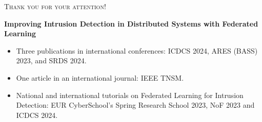 



\begin{frame}
  \centering
  \scshape\Large Thank you for your attention!

  \vfill
  
  \normalshape\normalsize

  \textbf{Improving Intrusion Detection in Distributed Systems with Federated Learning}
  
  \bigskip
  \raggedright
  \begin{itemize}
    \item Three publications in international \alert{conferences}: ICDCS 2024, ARES (BASS) 2023, and SRDS 2024.
    \item One article in an international \alert{journal}: IEEE TNSM.
    \item National and international \alert{tutorials} on Federated Learning for Intrusion Detection: EUR CyberSchool's Spring Research School 2023, NoF 2023 and ICDCS 2024.
  \end{itemize}

  \vfill
\end{frame}